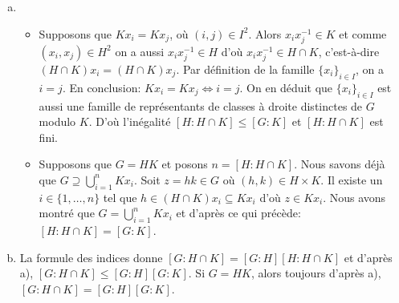\begin{enumerate}[a)]
\item
  \begin{itemize}
    \item Supposons que $Kx_i = Kx_j$, où $(i,j)\in I^2$. Alors $x_ix_j^{-1}\in
      K$ et comme $(x_i,x_j)\in H^2$ on a aussi $x_ix_j^{-1}\in H$ d'où
      $x_ix_j^{-1}\in H\cap K$, c'est-à-dire $(H\cap K)x_i = (H\cap K)x_j$. Par
      définition de la famille $\{x_i\}_{i\in I}$, on a $i = j$. En conclusion:
      $Kx_i = Kx_j\iff i = j$. On en déduit que $\{x_i\}_{i\in I}$ est aussi
      une famille de représentants de classes à droite distinctes de $G$ modulo
      $K$. D'où l'inégalité $[H\colon H\cap K]\leqslant [G\colon K]$ et
      $[H\colon H\cap K]$ est fini.

    \item Supposons que $G = HK$ et posons $n = [H\colon H\cap K]$. Nous savons
      déjà que $G\supseteq\bigcup_{i=1}^{n} Kx_i$.  Soit $z = hk\in G$ où
      $(h,k)\in H\times K$. Il existe un $i\in\{1,\ldots,n\}$ tel que $h\in
      (H\cap K)x_i\subseteq Kx_i$ d'où $z\in Kx_i$. Nous avons montré que $G =
      \bigcup_{i=1}^n Kx_i$ et d'après ce qui précède: $[H\colon H\cap K] =
      [G\colon K]$.
  \end{itemize}

\item La formule des indices donne $[G\colon H\cap K] = [G\colon H][H\colon
  H\cap K]$ et d'après a), $[G\colon H\cap K]\leqslant [G\colon H][G\colon K]$.
  Si $G = HK$, alors toujours d'après a), $[G\colon H\cap K] = [G\colon
  H][G\colon K]$.

\end{enumerate}
